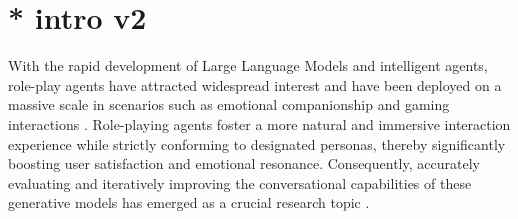 


\section{* intro v2}

With the rapid development of Large Language Models and intelligent agents, role-play agents have attracted widespread interest and have been deployed on a massive scale in scenarios such as emotional companionship and  gaming interactions \cite{tseng-etal-2024-two, chen2024persona}. Role-playing agents foster a more natural and immersive interaction experience while strictly conforming to designated personas, thereby significantly boosting user satisfaction and emotional resonance. Consequently, accurately evaluating and iteratively improving the conversational capabilities of these generative models has emerged as a crucial research topic \cite{wang-etal-2024-rolellm, lu-etal-2024-large}.

